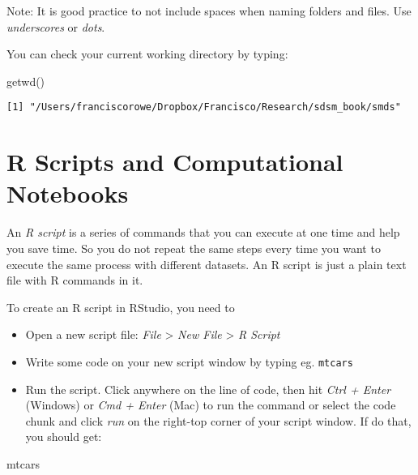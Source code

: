 \documentclass[
  letterpaper,
  krantz2]{style/krantz}
\newenvironment{Shaded}{\begin{snugshade}}{\end{snugshade}}
\newcommand{\FunctionTok}[1]{\textcolor[rgb]{0.28,0.35,0.67}{#1}}
\newcommand{\NormalTok}[1]{\textcolor[rgb]{0.00,0.23,0.31}{#1}}
\begin{document}
Note: It is good practice to not include spaces when naming folders and
files. Use \emph{underscores} or \emph{dots}.

You can check your current working directory by typing:

\begin{Shaded}
\begin{Highlighting}[]
\FunctionTok{getwd}\NormalTok{()}
\end{Highlighting}
\end{Shaded}

\begin{verbatim}
[1] "/Users/franciscorowe/Dropbox/Francisco/Research/sdsm_book/smds"
\end{verbatim}

\hypertarget{r-scripts-and-computational-notebooks}{%
\section{R Scripts and Computational
Notebooks}\label{r-scripts-and-computational-notebooks}}

An \emph{R script} is a series of commands that you can execute at one
time and help you save time. So you do not repeat the same steps every
time you want to execute the same process with different datasets. An R
script is just a plain text file with R commands in it.

To create an R script in RStudio, you need to

\begin{itemize}
\item
  Open a new script file: \emph{File} \textgreater{} \emph{New File}
  \textgreater{} \emph{R Script}
\item
  Write some code on your new script window by typing eg.
  \texttt{mtcars}
\item
  Run the script. Click anywhere on the line of code, then hit
  \emph{Ctrl + Enter} (Windows) or \emph{Cmd + Enter} (Mac) to run the
  command or select the code chunk and click \emph{run} on the right-top
  corner of your script window. If do that, you should get:
\end{itemize}

\begin{Shaded}
\begin{Highlighting}[]
\NormalTok{mtcars}
\end{Highlighting}
\end{Shaded}
\end{document}
